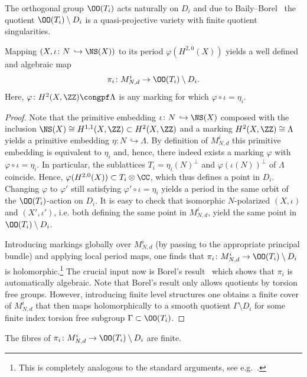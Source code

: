 The orthogonal group $\OO(T_i)$ acts naturally on $D_i$ and due to Baily--Borel~\cite{BB} the quotient $\OO(T_i)\setminus D_i$ is a quasi-projective variety with finite quotient singularities.

\begin{prop}
Mapping $(X,\iota\colon N\,\hookrightarrow \NS(X))$ to its period $\varphi(H^{2,0}(X))$ yields a well defined and algebraic map
\[
\pi_i\colon M^i_{N,d}\to \OO(T_i)\setminus D_i.
\]
Here, $\varphi\colon H^2(X,\ZZ)\congpf \Lambda$ is any marking for which $\varphi\circ\iota=\eta_i$.
\end{prop}

\begin{proof}
Note that the primitive embedding $\iota\colon N\,\hookrightarrow \NS(X)$ composed with the inclusion $\NS(X)\cong H^{1,1}(X,\ZZ)\subset H^2(X,\ZZ)$ and a marking $ H^2(X,\ZZ)\cong\Lambda$ yields a primitive embedding $\eta\colon N\,\hookrightarrow \Lambda$. By definition of $M^i_{N,d}$ this primitive embedding is equivalent to $\eta_i$ and, hence, there indeed exists a marking $\varphi$ with $\varphi\circ\iota=\eta_i$. In particular, the sublattices $T_i=\eta_i(N)^\perp$ and $\varphi(\iota(N))^\perp$ of $\Lambda$ coincide. Hence, $\varphi(H^{2,0}(X))\subset T_i\otimes \CC$, which thus defines a point in $D_i$. Changing $\varphi$ to $\varphi'$ still satisfying $\varphi'\circ\iota=\eta_i$ yields a period in the same orbit of the $\OO(T_i)$-action on $D_i$. It is easy to check that isomorphic $N$-polarized $(X,\iota)$ and $(X',\iota')$, i.e. both defining the same point in $M^i_{N,d}$, yield the same point in $\OO(T_i)\setminus D_i$.

Introducing markings globally over $M^i_{N,d}$ (by passing to the appropriate principal bundle) and applying local period maps, one finds that $\pi_i\colon M^i_{N,d}\to \OO(T_i)\setminus D_i$ is holomorphic.\footnote{This is completely analogous to the standard arguments, see e.g.~\cite{Beauv,Dolg,HuyK3}.} The crucial input now is Borel's result~\cite{Bor} which shows that $\pi_ i$ is automatically algebraic. Note that Borel's result only allows quotients by torsion free groups. However, introducing finite level structures one obtains a finite cover of $M^i_{N,d}$ that then maps holomorphically to a smooth quotient $\Gamma\setminus D_i$ for some finite index torsion free subgroup $\Gamma\subset \OO(T_i)$.
\end{proof}

\begin{coro}\label{cor:finitefibre}
The fibres of $\pi_i\colon M^i_{N,d}\to \OO(T_i)\setminus D_i$ are finite.
\end{coro}

